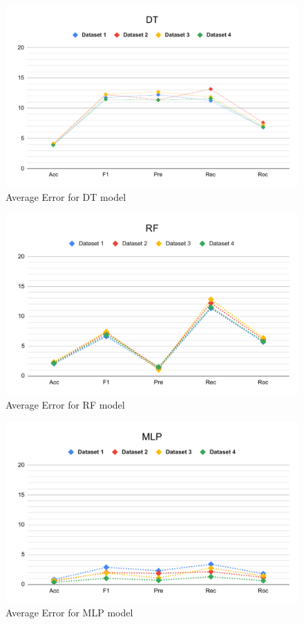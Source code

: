 \begin{figure}[btp]
    \centering
    \includegraphics[width=0.9\columnwidth]{media/results/delta_DT.pdf}
    \caption{Average Error for DT model} \label{fig:perfromance_delta_dt}
\end{figure}

\begin{figure}[btp]
    \centering
    \includegraphics[width=0.9\columnwidth]{media/results/delta_RF.pdf}
    \caption{Average Error for RF model} \label{fig:perfromance_delta_rf}
\end{figure}

\begin{figure}[btp]
    \centering
    \includegraphics[width=0.9\columnwidth]{media/results/delta_MLP.pdf}
    \caption{Average Error for MLP model} \label{fig:perfromance_delta_mlp}
\end{figure}

